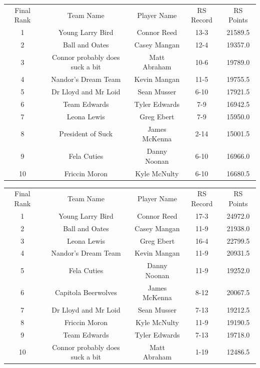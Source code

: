 \documentclass[11pt,letterpaper]{article}
\begin{document}
\newpage
{}
\vspace{-25pt}
\begin{table} [h]
\begin{center}
\begin{tabular} { c c c c c }
\\ Final Rank & Team Name & Player Name & RS Record & RS Points
\\ 1 & Young Larry Bird & Connor Reed & 13-3 & 21589.5
\\ 2 & Ball and Oates & Casey Mangan & 12-4 & 19357.0
\\ 3 & Connor probably does suck a bit & Matt Abraham & 10-6 & 19789.0
\\ 4 & Nandor's Dream Team & Kevin Mangan & 11-5 & 19755.5
\\ 5 & Dr Lloyd and Mr Loid & Sean Musser & 6-10 & 17921.5
\\ 6 & Team Edwards & Tyler Edwards & 7-9 & 16942.5
\\ 7 & Leona Lewis & Greg Ebert & 7-9 & 15950.0
\\ 8 & President of Suck & James McKenna & 2-14 & 15001.5
\\ 9 & Fela Cuties & Danny Noonan & 6-10 & 16966.0
\\ 10 & Friccin Moron & Kyle McNulty & 6-10 & 16680.5
\end{tabular}
\end{center}
\end{table}

\vspace{-25pt}
\begin{table} [h]
\begin{center}
\begin{tabular} { c c c c c }
\\ Final Rank & Team Name & Player Name & RS Record & RS Points
\\ 1 & Young Larry Bird & Connor Reed & 17-3 & 24972.0
\\ 2 & Ball and Oates & Casey Mangan & 11-9 & 21938.0
\\ 3 & Leona Lewis & Greg Ebert & 16-4 & 22799.5
\\ 4 & Nandor's Dream Team & Kevin Mangan & 11-9 & 20931.5
\\ 5 & Fela Cuties & Danny Noonan & 11-9 & 19252.0
\\ 6 & Capitola Beerwolves & James McKenna & 8-12 & 20067.5
\\ 7 & Dr Lloyd and Mr Loid & Sean Musser & 7-13 & 19212.5
\\ 8 & Friccin Moron & Kyle McNulty & 11-9 & 19190.5
\\ 9 & Team Edwards & Tyler Edwards & 7-13 & 19718.0
\\ 10 & Connor probably does suck a bit & Matt Abraham & 1-19 & 12486.5
\end{tabular}
\end{center}

\end{table}
\end{document}
